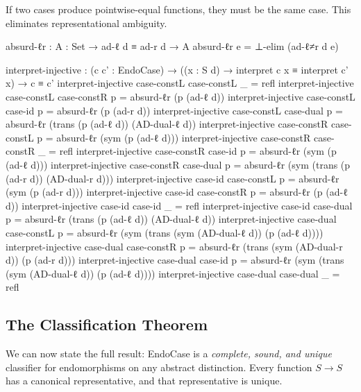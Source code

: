 \documentclass[11pt,a4paper]{book}
\begin{document}
If two cases produce pointwise-equal functions, they must be the same case.
This eliminates representational ambiguity.

\begin{code}
  absurd-ℓr : {A : Set} → ad-ℓ d ≡ ad-r d → A
  absurd-ℓr e = ⊥-elim (ad-ℓ≠r d e)

  interpret-injective :
    (c c' : EndoCase) →
    ((x : S d) → interpret c x ≡ interpret c' x) →
    c ≡ c'
  interpret-injective case-constL case-constL _ = refl
  interpret-injective case-constL case-constR p = absurd-ℓr (p (ad-ℓ d))
  interpret-injective case-constL case-id     p = absurd-ℓr (p (ad-r d))
  interpret-injective case-constL case-dual   p =
    absurd-ℓr (trans (p (ad-ℓ d)) (AD-dual-ℓ d))
  interpret-injective case-constR case-constL p =
    absurd-ℓr (sym (p (ad-ℓ d)))
  interpret-injective case-constR case-constR _ = refl
  interpret-injective case-constR case-id     p =
    absurd-ℓr (sym (p (ad-ℓ d)))
  interpret-injective case-constR case-dual   p =
    absurd-ℓr (sym (trans (p (ad-r d)) (AD-dual-r d)))
  interpret-injective case-id case-constL     p =
    absurd-ℓr (sym (p (ad-r d)))
  interpret-injective case-id case-constR     p =
    absurd-ℓr (p (ad-ℓ d))
  interpret-injective case-id case-id         _ = refl
  interpret-injective case-id case-dual       p =
    absurd-ℓr (trans (p (ad-ℓ d)) (AD-dual-ℓ d))
  interpret-injective case-dual case-constL   p =
    absurd-ℓr (sym (trans (sym (AD-dual-ℓ d)) (p (ad-ℓ d))))
  interpret-injective case-dual case-constR   p =
    absurd-ℓr (trans (sym (AD-dual-r d)) (p (ad-r d)))
  interpret-injective case-dual case-id       p =
    absurd-ℓr (sym (trans (sym (AD-dual-ℓ d)) (p (ad-ℓ d))))
  interpret-injective case-dual case-dual     _ = refl
\end{code}

\subsection{The Classification Theorem}

We can now state the full result: EndoCase is a \emph{complete, sound, and unique}
classifier for endomorphisms on any abstract distinction. Every function $S \to S$
has a canonical representative, and that representative is unique.
\end{document}
